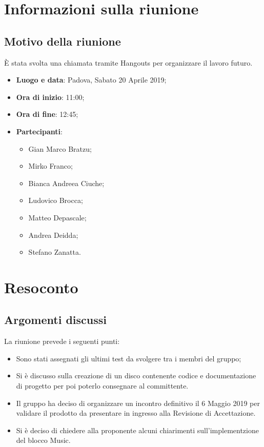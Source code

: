 \documentclass[a4paper,12pt]{article}
\begin{document}
	\tableofcontents
	\cleardoublepage
	\section{Informazioni sulla riunione}
	\subsection{Motivo della riunione} \`{E} stata svolta una chiamata tramite Hangouts per organizzare il lavoro futuro.
	\begin{itemize}
		\item \textbf{Luogo e data}: Padova, Sabato 20 Aprile 2019;
		\item \textbf{Ora di inizio}: 11:00;
		\item \textbf{Ora di fine}: 12:45;
		\item \textbf{Partecipanti}:  
		\begin{itemize}
			\item Gian Marco Bratzu;
			\item Mirko Franco;
			\item Bianca Andreea Ciuche;
			\item Ludovico Brocca;
			\item Matteo Depascale;
			\item Andrea Deidda;
			\item Stefano Zanatta.
		\end{itemize}
	\end{itemize}
	
	
		\section{Resoconto}
	\subsection{Argomenti discussi}
	La riunione prevede i seguenti punti:
	\begin{itemize}		
		\item Sono stati assegnati gli ultimi test da svolgere tra i membri del gruppo;
		\item Si è discusso sulla creazione di un disco contenente codice e documentazione di progetto per poi poterlo consegnare al committente.
      	\item Il gruppo ha deciso di organizzare un incontro definitivo il 6 Maggio 2019 per validare il prodotto da presentare in ingresso alla Revisione di Accettazione.
      	\item Si è deciso di chiedere alla proponente  alcuni chiarimenti sull'implementzione del blocco  Music.
	\end{itemize}
	
\end{document}
